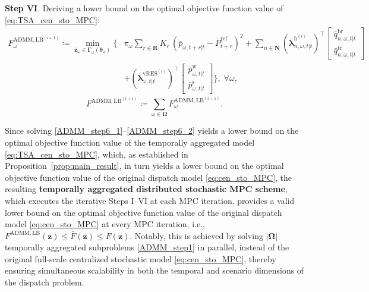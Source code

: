 \documentclass[a4paper,fleqn]{cas-sc}
\begin{document}
\textbf{Step VI}. Deriving a lower bound on the optimal objective function value of \eqref{eq:TSA_cen_sto_MPC}:
\begin{align}
F^{{\mathrm{ADMM,LB}}^{(i+1)}}_{\omega} \coloneqq 
\min_{\boldsymbol{\bar{z}}_\omega \in \boldsymbol{\Gamma}_\omega(\boldsymbol{\theta}_\omega)}
\Bigg\{
& \pi_{\omega} \sum_{r \in \boldsymbol{R}} K_r \, \left( \bar{p}_{\omega, t+r|t} - \bar{P}^{\mathrm{ref}}_{t+r} \right)^2
+ \sum_{n \in \boldsymbol{N}}
\left(\boldsymbol{\bar{\lambda}}^{\boldsymbol{\mathrm{h}}^{(i)}}_{n,\omega,t|t}\right)^\top
\begin{bmatrix}
\bar{q}^{\mathrm{br}}_{n,\omega,t|t} \\
\bar{q}^{\mathrm{tr}}_{n,\omega,t|t}
\end{bmatrix}
\nonumber\\
& + \left(\boldsymbol{\bar{\lambda}}^{\boldsymbol{\mathrm{vRES}}^{(i)}}_{\omega,t|t}\right)^\top
\begin{bmatrix}
\bar{p}^{\mathrm{w}}_{\omega,t|t} \\
\bar{p}^{\mathrm{s}}_{\omega,t|t}
\end{bmatrix}
\Bigg\}, \; \forall \omega,
\label{ADMM_step6_1}
\end{align}
\begin{equation}
F^{{\mathrm{ADMM,LB}}^{(i+1)}} \coloneqq \sum_{\omega \in \boldsymbol{\Omega}} F^{{\mathrm{ADMM,LB}}^{(i+1)}}_{\omega}.
\label{ADMM_step6_2}
\end{equation}

Since solving \eqref{ADMM_step6_1}--\eqref{ADMM_step6_2} yields a lower bound on the optimal objective function value of the temporally aggregated model \eqref{eq:TSA_cen_sto_MPC},
which, as established in Proposition~\ref{prop:main_result}, in turn yields a lower bound on the optimal objective function value of the original dispatch model \eqref{eq:cen_sto_MPC},
the resulting \textbf{temporally aggregated distributed stochastic MPC scheme}, which executes the iterative Steps I–VI at each MPC iteration,
provides a valid lower bound on the optimal objective function value of the original dispatch model \eqref{eq:cen_sto_MPC} at every MPC iteration,
i.e., $F^{{\mathrm{ADMM,LB}}}(\boldsymbol{\bar{z}}) \leq \bar{F}(\boldsymbol{\bar{z}}) \leq F(\boldsymbol{z})$.
Notably, this is achieved by solving $|\boldsymbol{\Omega}|$ temporally aggregated subproblems \eqref{ADMM_step1} in parallel,
instead of the original full-scale centralized stochastic model \eqref{eq:cen_sto_MPC},
thereby ensuring simultaneous scalability in both the temporal and scenario dimensions of the dispatch problem.
\end{document}
